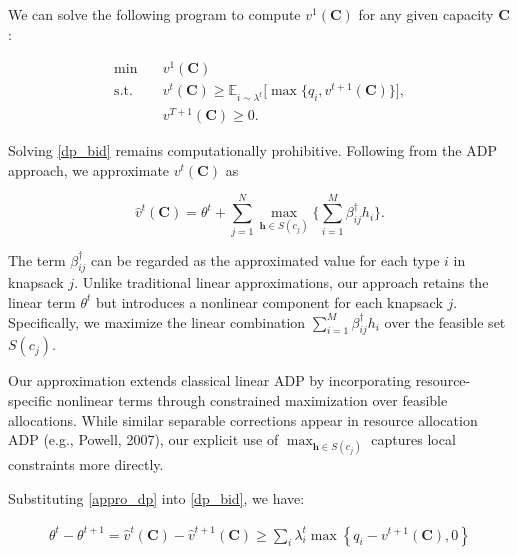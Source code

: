 We can solve the following program to compute $v^1(\bm{C})$ for any given capacity $\bm{C}$:

\begin{equation}\label{dp_bid}
    \begin{aligned}
    \min \quad & v^{1}(\bm{C}) \\
    \mathrm{s.t.} \quad & v^{t}(\bm{C}) \geq \mathbb{E}_{i \sim \lambda^t}\Bigg[\max\Big\{ q_{i}, v^{t+1}(\bm{C})\Big\}\Bigg], \\
    & v^{T+1}(\bm{C}) \geq 0.
    \end{aligned}
\end{equation}


Solving \eqref{dp_bid} remains computationally prohibitive. Following from the ADP approach, we approximate $v^{t}(\bm{C})$ as 

\begin{equation}\label{appro_dp}
    \hat{v}^{t}(\bm{C}) = \theta^{t} + \sum_{j=1}^{N} \max_{\bm{h} \in S(c_{j})} \{\sum_{i=1}^{M} \beta_{ij}^{\dag} h_{i}\}.
\end{equation}

The term $\beta_{ij}^{\dag}$ can be regarded as the approximated value for each type $i$ in knapsack $j$. Unlike traditional linear approximations, our approach retains the linear term $\theta^{t}$ but introduces a nonlinear component for each knapsack $j$. Specifically, we maximize the linear combination $\sum_{i=1}^{M} \beta_{ij}^{\dag} h_{i}$ over the feasible set $S(c_{j})$.

Our approximation extends classical linear ADP by incorporating resource-specific nonlinear terms through constrained maximization over feasible allocations. While similar separable corrections appear in resource allocation ADP (e.g., Powell, 2007), our explicit use of $\max_{\bm{h} \in S(c_j)}$ captures local constraints more directly.



Substituting \eqref{appro_dp} into \eqref{dp_bid}, we have:

\begin{align}
    \theta^{t} - \theta^{t+1} = \hat{v}^{t}(\bm{C}) - \hat{v}^{t+1}(\bm{C}) \geq \sum_{i} \lambda_{i}^{t} \max\left\{q_{i} - v^{t+1}(\bm{C}), 0\right\}
\end{align}

